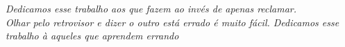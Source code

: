 \begin{dedicatoria}
   \vspace*{\fill}
   \centering
   \noindent

   \textit{Dedicamos esse trabalho aos que fazem ao invés de apenas reclamar.\\
Olhar pelo retrovisor e dizer o outro está errado é muito fácil. Dedicamos esse trabalho à aqueles que aprendem errando} \vspace*{\fill}
\end{dedicatoria}
